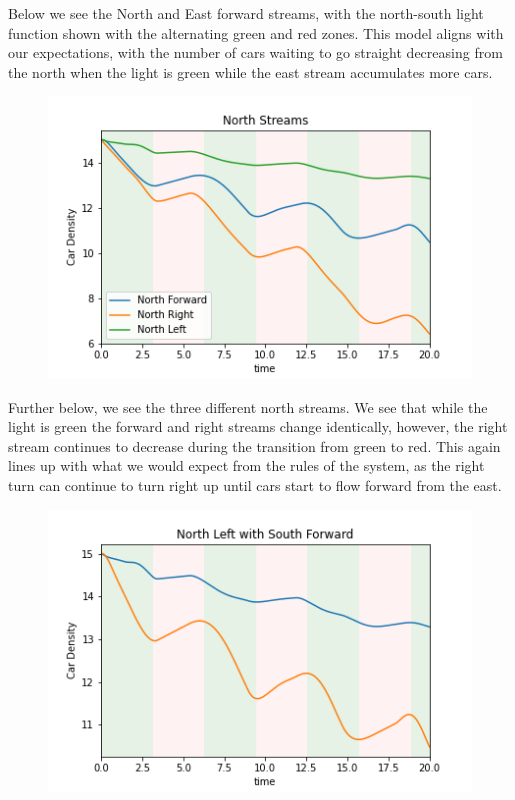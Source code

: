 \documentclass[12pt]{article}
\begin{document}
Below we see the North and East forward streams, with the north-south light function shown with the alternating green and red zones. This model aligns with our expectations, with the number of cars waiting to go straight decreasing from the north when the light is green while the east stream accumulates more cars.\\

\begin{figure}[h!]
    \centering
    \includegraphics[width=12cm]{figures/NorthStreams.png}
    \label{fig:NorthStreams}
\end{figure}

Further below, we see the three different north streams. We see that while the light is green the forward and right streams change identically, however, the right stream continues to decrease during the transition from green to red. This again lines up with what we would expect from the rules of the system, as the right turn can continue to turn right up until cars start to flow forward from the east.\\

\begin{figure}[h!]
    \centering
    \includegraphics[width=12cm]{figures/NorthLeftwithSouthForward.png}
    \label{fig:NorthLeftwithSouthForward}
\end{figure}
\end{document}
